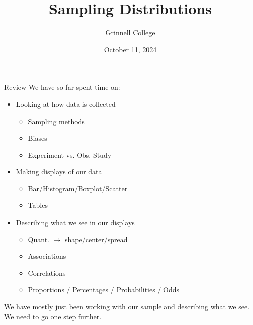\documentclass{beamer}
\title[SST-115 / STA-209]{Sampling Distributions}
\subtitle{}
\author{Grinnell College}
\date{October 11, 2024}
\begin{document}
\begin{frame}
  \titlepage
\end{frame}

\begin{frame}{Review}
We have so far spent time on:
\begin{itemize}
    \item Looking at how data is collected
        \begin{itemize}
            \item Sampling methods
            \item Biases
            \item Experiment vs. Obs. Study
        \end{itemize}
    \item Making displays of our data
        \begin{itemize}
            \item Bar/Histogram/Boxplot/Scatter
            \item Tables
        \end{itemize}
    \item Describing what we see in our displays
        \begin{itemize}
            \item Quant. $\rightarrow$ shape/center/spread
            \item Associations
            \item Correlations
            \item Proportions / Percentages / Probabilities / Odds
        \end{itemize} \vspace{4mm}
\end{itemize}

We have mostly just been working with our sample and describing what we see. We need to go one step further.
\end{frame}
\end{document}

